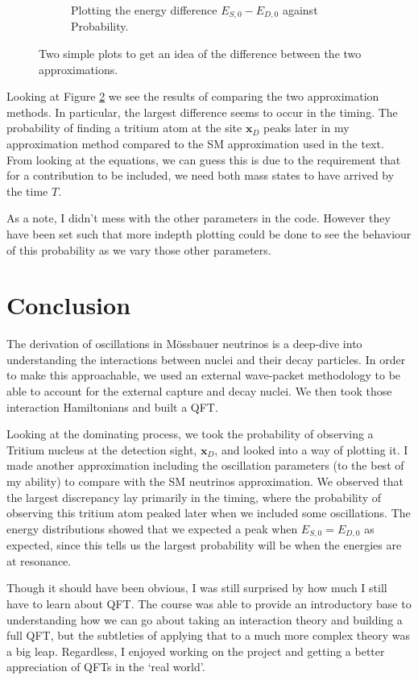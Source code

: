 \documentclass[10pt]{article}
\begin{document}
\begin{figure}
\begin{subfigure}[b]{0.4\textwidth}
    \caption{Plotting the energy difference $E_{S,0} - E_{D,0}$ against Probability.}
    \label{fig:energy}
  \end{subfigure}
  \caption{Two simple plots to get an idea of the difference between the two approximations.}
  \label{fig:plots}
\end{figure}

Looking at Figure \ref{fig:plots} we see the results of comparing the two approximation methods. In particular, the largest difference seems to occur in the timing. The probability of finding a tritium atom at the site $\bm{x}_{D}$ peaks later in my approximation method compared to the SM approximation used in the text. From looking at the equations, we can guess this is due to the requirement that for a contribution to be included, we need both mass states to have arrived by the time $T$.

As a note, I didn't mess with the other parameters in the code. However they have been set such that more indepth plotting could be done to see the behaviour of this probability as we vary those other parameters.

\section{Conclusion}

The derivation of oscillations in M\"{o}ssbauer neutrinos is a deep-dive into understanding the interactions between nuclei and their decay particles.  In order to make this approachable, we used an external wave-packet methodology to be able to account for the external capture and decay nuclei. We then took those interaction Hamiltonians and built a QFT.

Looking at the dominating process, we took the probability of observing a Tritium nucleus at the detection sight, $\bm{x}_{D}$, and looked into a way of plotting it. I made another approximation including the oscillation parameters (to the best of my ability) to compare with the SM neutrinos approximation. We observed that the largest discrepancy lay primarily in the timing, where the probability of observing this tritium atom peaked later when we included some oscillations. The energy distributions showed that we expected a peak when $E_{S,0} = E_{D,0}$ as expected, since this tells us the largest probability will be when the energies are at resonance. 

Though it should have been obvious, I was still surprised by how much I still have to learn about QFT. The course was able to provide an introductory base to understanding how we can go about taking an interaction theory and building a full QFT, but the subtleties of applying that to a much more complex theory was a big leap. Regardless, I enjoyed working on the project and getting a better appreciation of QFTs in the `real world'.
\end{document}
